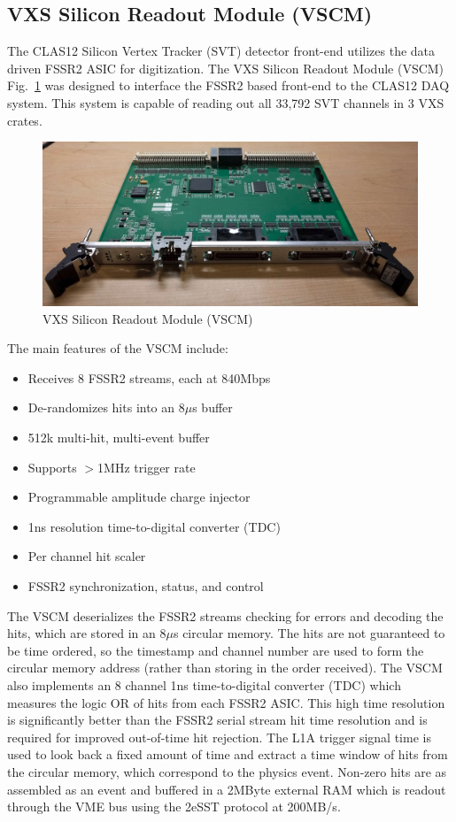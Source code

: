 \subsection{VXS Silicon Readout Module (VSCM)}

The CLAS12 Silicon Vertex Tracker (SVT) detector front-end utilizes the data driven FSSR2 ASIC for digitization. The VXS Silicon Readout Module (VSCM) Fig.~\ref{fig:vscm_board} was designed to interface the FSSR2 based front-end to the CLAS12 DAQ system. This system is capable of reading out all 33,792 SVT channels in 3 VXS crates.

\begin{figure}[hbt]
	\centering
	\includegraphics[width=1.0\columnwidth,keepaspectratio]{img/vscm_board.png}
	\caption{VXS Silicon Readout Module (VSCM)}
	\label{fig:vscm_board}
\end{figure}

The main features of the VSCM include:

\begin{itemize}
	\item Receives 8 FSSR2 streams, each at 840Mbps
	\item De-randomizes hits into an 8$\mu$s buffer
	\item 512k multi-hit, multi-event buffer
	\item Supports $>$1MHz trigger rate
	\item Programmable amplitude charge injector
	\item 1ns resolution time-to-digital converter (TDC)
	\item Per channel hit scaler
	\item FSSR2 synchronization, status, and control
\end{itemize}

The VSCM deserializes the FSSR2 streams checking for errors and decoding the hits, which are stored in an 8$\mu$s circular memory. The hits are not guaranteed to be time ordered, so the timestamp and channel number are used to form the circular memory address (rather than storing in the order received). The VSCM also implements an 8 channel 1ns time-to-digital converter (TDC) which measures the logic OR of hits from each FSSR2 ASIC. This high time resolution is significantly better than the FSSR2 serial stream hit time resolution and is required for improved out-of-time hit rejection. The L1A trigger signal time is used to look back a fixed amount of time and extract a time window of hits from the circular memory, which correspond to the physics event. Non-zero hits are as assembled as an event and buffered in a 2MByte external RAM which is readout through the VME bus using the 2eSST protocol at 200MB/s.


